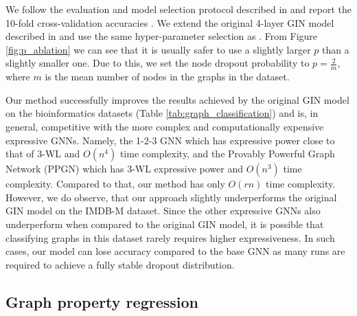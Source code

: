 \documentclass{article}
\begin{document}
We follow the evaluation and model selection protocol described in \citep{GIN} and report the 10-fold cross-validation accuracies \citep{yanardag2015deep}. We extend the original 4-layer GIN model described in \citep{GIN} and use the same hyper-parameter selection as \citep{GIN}. 
From Figure \ref{fig:p_ablation} we can see that it is usually safer to use a slightly larger $p$ than a slightly smaller one. Due to this, we set the node dropout probability to $p=\frac{2}{m}$, where $m$ is the mean number of nodes in the graphs in the dataset.

Our method successfully improves the results achieved by the original GIN model on the bioinformatics datasets (Table \ref{tab:graph_classification}) and is, in general, competitive with the more complex and computationally expensive expressive GNNs. Namely, the 1-2-3 GNN \citep{morris2019weisfeiler} which has expressive power close to that of 3-WL and $O(n^4)$ time complexity, and the Provably Powerful Graph Network (PPGN) \citep{maron2019provably} which has 3-WL expressive power and $O(n^3)$ time complexity. Compared to that, our method has only $O(rn)$ time complexity.
However, we do observe, that our approach slightly underperforms the original GIN model on the IMDB-M dataset.
Since the other expressive GNNs also underperform when compared to the original GIN model, it is possible that classifying graphs in this dataset rarely requires higher expressiveness. In such cases, our model can lose accuracy compared to the base GNN as many runs are required to achieve a fully stable dropout distribution. 

\subsection{Graph property regression}
\end{document}
